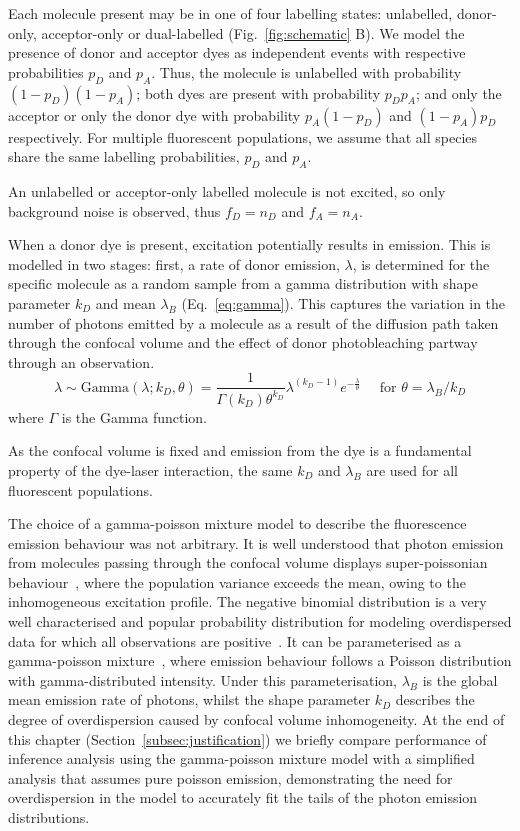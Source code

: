 Each molecule present may be in one of four labelling states: unlabelled, donor-only, acceptor-only or dual-labelled (Fig.~\ref{fig:schematic} B). We model the presence of donor and acceptor dyes as independent events with respective probabilities $p_D$ and $p_A$. Thus, the molecule is unlabelled with probability $(1-p_D)(1-p_A)$; both dyes are present with probability $p_D p_A$; and only the acceptor or only the donor dye with probability $p_A (1-p_D)$ and $(1-p_A)p_D$ respectively. For multiple fluorescent populations, we assume that all species share the same labelling probabilities, $p_D$ and $p_A$. 

An unlabelled or acceptor-only labelled molecule is not excited, so only background noise is observed, thus $f_D = n_D$ and $f_A = n_A$.

When a donor dye is present, excitation potentially results in emission. This is modelled in two stages: first, a rate of donor emission, $\lambda$, is determined for the specific molecule as a random sample from a gamma distribution with shape parameter $k_D$ and mean $\lambda_B$ (Eq.~\ref{eq:gamma}). This captures the variation in the number of photons emitted by a molecule as a result of the diffusion path taken through the confocal volume and the effect of donor photobleaching partway through an observation.
\begin{equation}
\lambda \sim \text{Gamma}(\lambda; k_D, \theta) =  \frac{1}{\Gamma(k_D) \theta^{k_D}} \lambda^{(k_D - 1)} e^{-\frac{\lambda}{\theta}} \quad\text{ for } \theta = \lambda_B / k_D
\label{eq:gamma}
\end{equation} 
where $\Gamma$ is the Gamma function. 

As the confocal volume is fixed and emission from the dye is a fundamental property of the dye-laser interaction, the same $k_D$ and $\lambda_B$ are used for all fluorescent populations. 

The choice of a gamma-poisson mixture model to describe the fluorescence emission behaviour was not arbitrary. It is well understood that photon emission from molecules passing through the confocal volume displays super-poissonian behaviour~\cite{chen99}, where the population variance exceeds the mean, owing to the inhomogeneous excitation profile. The negative binomial distribution is a very well characterised and popular probability distribution for modeling overdispersed data for which all observations are positive~\cite{lloydsmith07, bliss53}. It can be parameterised as a gamma-poisson mixture~\cite{lloydsmith07}, where emission behaviour follows a Poisson distribution with gamma-distributed intensity. Under this parameterisation, $\lambda_B$ is the global mean emission rate of photons, whilst the shape parameter $k_D$ describes the degree of overdispersion caused by confocal volume inhomogeneity. At the end of this chapter (Section~\ref{subsec:justification}) we briefly compare performance of inference analysis using the gamma-poisson mixture model with a simplified analysis that assumes pure poisson emission, demonstrating the need for overdispersion in the model to accurately fit the tails of the photon emission distributions.  

